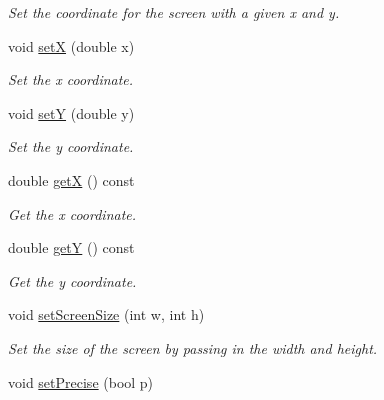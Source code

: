 \begin{DoxyCompactItemize}
\begin{DoxyCompactList}\small\item\em Set the coordinate for the screen with a given x and y. \end{DoxyCompactList}\item 
void \hyperlink{classLevel_a6212b3c03b3efc82cf69e642cc093959}{setX} (double x)\hypertarget{classLevel_a6212b3c03b3efc82cf69e642cc093959}{}\label{classLevel_a6212b3c03b3efc82cf69e642cc093959}

\begin{DoxyCompactList}\small\item\em Set the x coordinate. \end{DoxyCompactList}\item 
void \hyperlink{classLevel_a7c67443008f7e0f4b5d1630ff2dcf179}{setY} (double y)\hypertarget{classLevel_a7c67443008f7e0f4b5d1630ff2dcf179}{}\label{classLevel_a7c67443008f7e0f4b5d1630ff2dcf179}

\begin{DoxyCompactList}\small\item\em Set the y coordinate. \end{DoxyCompactList}\item 
double \hyperlink{classLevel_a6f5dca509c0e480d8a7b6b1d6b411375}{getX} () const \hypertarget{classLevel_a6f5dca509c0e480d8a7b6b1d6b411375}{}\label{classLevel_a6f5dca509c0e480d8a7b6b1d6b411375}

\begin{DoxyCompactList}\small\item\em Get the x coordinate. \end{DoxyCompactList}\item 
double \hyperlink{classLevel_acb5b4e5e0bf364142fa0facc7badea4a}{getY} () const \hypertarget{classLevel_acb5b4e5e0bf364142fa0facc7badea4a}{}\label{classLevel_acb5b4e5e0bf364142fa0facc7badea4a}

\begin{DoxyCompactList}\small\item\em Get the y coordinate. \end{DoxyCompactList}\item 
void \hyperlink{classLevel_a22a202624bb540acc74b678b74b60c9d}{set\+Screen\+Size} (int w, int h)\hypertarget{classLevel_a22a202624bb540acc74b678b74b60c9d}{}\label{classLevel_a22a202624bb540acc74b678b74b60c9d}

\begin{DoxyCompactList}\small\item\em Set the size of the screen by passing in the width and height. \end{DoxyCompactList}\item 
void \hyperlink{classLevel_a6f522671fde4a9d25945a9df651f6e28}{set\+Precise} (bool p)\hypertarget{classLevel_a6f522671fde4a9d25945a9df651f6e28}{}\label{classLevel_a6f522671fde4a9d25945a9df651f6e28}


\end{DoxyCompactItemize}
